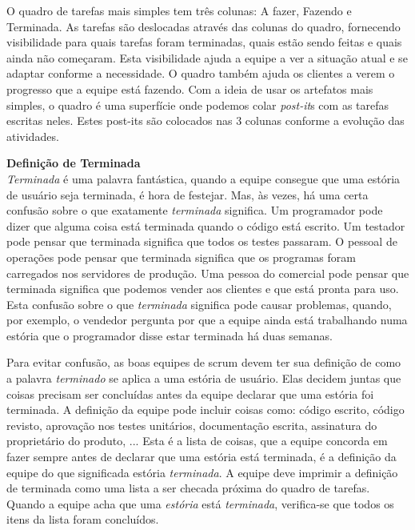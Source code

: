 O quadro de tarefas mais simples tem três colunas: A fazer, Fazendo e Terminada. As tarefas são deslocadas através das colunas do quadro, fornecendo visibilidade para quais tarefas foram terminadas, quais estão sendo feitas e quais ainda não começaram. Esta visibilidade ajuda a equipe a ver a situação atual e se adaptar conforme a necessidade. O quadro também ajuda os clientes a verem o progresso que a equipe está fazendo. Com a ideia de usar os artefatos mais simples, o quadro é uma superfície onde podemos colar \textit{post-it}s com as tarefas escritas neles. Estes post-its são colocados nas 3 colunas conforme a evolução das atividades.

\begin{center}
\parbox{16cm}{
\textbf{Definição de Terminada}\\
\textit{Terminada} é uma palavra fantástica, quando a equipe consegue que uma estória de usuário seja terminada, é hora de festejar. Mas, às vezes, há uma certa confusão sobre o que exatamente \emph{terminada} significa. Um programador pode dizer que alguma coisa está terminada quando o código está escrito. Um testador pode pensar que terminada significa que todos os testes passaram. O pessoal de operações pode pensar que terminada significa que os programas foram carregados nos servidores de produção. Uma pessoa do comercial pode pensar que terminada significa que podemos vender aos clientes e que está pronta para uso. Esta confusão sobre o que \emph{terminada} significa pode causar problemas, quando, por exemplo, o vendedor pergunta por que a equipe ainda está trabalhando numa estória que o programador disse estar terminada há duas semanas.

Para evitar confusão, as boas equipes de scrum devem ter sua definição de como a palavra \emph{terminado} se aplica a uma estória de usuário. Elas decidem juntas que coisas precisam ser concluídas antes da equipe declarar que uma estória foi terminada. A definição da equipe pode incluir coisas como: código escrito, código revisto, aprovação nos testes unitários, documentação escrita, assinatura do proprietário do produto, ... Esta é a lista de coisas, que a equipe concorda em fazer sempre antes de declarar que uma estória está terminada, é a definição da equipe do que significada estória \emph{terminada}. A equipe deve imprimir a definição de terminada como uma lista a ser checada próxima do quadro de tarefas. Quando a equipe acha que uma \emph{estória} está \emph{terminada}, verifica-se que todos os itens da lista foram concluídos.
}

\end{center}

